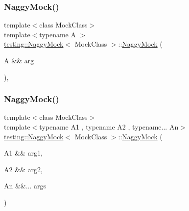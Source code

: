 \subsubsection{\texorpdfstring{NaggyMock()}{NaggyMock()}\hspace{0.1cm}{\footnotesize\ttfamily [5/17]}}
{\footnotesize\ttfamily template$<$class Mock\+Class$>$ \\
template$<$typename A $>$ \\
\mbox{\hyperlink{classtesting_1_1_naggy_mock}{testing\+::\+Naggy\+Mock}}$<$ Mock\+Class $>$\+::\mbox{\hyperlink{classtesting_1_1_naggy_mock}{Naggy\+Mock}} (\begin{DoxyParamCaption}\item[{A \&\&}]{arg }\end{DoxyParamCaption})\hspace{0.3cm}{\ttfamily [inline]}, {\ttfamily [explicit]}}

\mbox{\label{classtesting_1_1_naggy_mock_a0169b9eb645d153991fa975c65074179}} 
\subsubsection{\texorpdfstring{NaggyMock()}{NaggyMock()}\hspace{0.1cm}{\footnotesize\ttfamily [6/17]}}
{\footnotesize\ttfamily template$<$class Mock\+Class$>$ \\
template$<$typename A1 , typename A2 , typename... An$>$ \\
\mbox{\hyperlink{classtesting_1_1_naggy_mock}{testing\+::\+Naggy\+Mock}}$<$ Mock\+Class $>$\+::\mbox{\hyperlink{classtesting_1_1_naggy_mock}{Naggy\+Mock}} (\begin{DoxyParamCaption}\item[{A1 \&\&}]{arg1,  }\item[{A2 \&\&}]{arg2,  }\item[{An \&\&...}]{args }\end{DoxyParamCaption})\hspace{0.3cm}{\ttfamily [inline]}}

\mbox{\label{classtesting_1_1_naggy_mock_a9d00e4811942489b4c3cdd8e8c658518}} 
